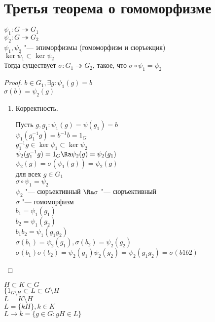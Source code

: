 ﻿\section{Третья теорема о гомоморфизме}
\begin{theorem}
$\psi_1 \colon G \twoheadrightarrow G_1$ \\
$\psi_2 \colon G \twoheadrightarrow G_2$ \\
$\psi_1, \psi_2$ "--- эпиморфизмы (гомоморфизм и сюръекция)\\
$\ker \psi_1 \subset \ker \psi_2$\\
Тогда существует $\sigma \colon G_1 \twoheadrightarrow G_2$, такое, что $\sigma \circ \psi_1 = \psi_2$\\
\end{theorem}
\begin{proof}
$b \in G_1, \exists g \colon \psi_1(g) = b$\\
$\sigma (b) = \psi_2(g)$\\

\begin{enumerate}
\item Корректность.

Пусть $g, g_1 \colon \psi_1(g) = \psi(g_1) = b$\\
$\psi_1(g_1^{-1}g) = b^{-1}b = 1_G$\\
$g_1^{-1}g \in \ker \psi_1 \subset \ker \psi_2$\\
$\psi_2(g_1^{-1}g) = 1_G \Ra \psi_2(g) = \psi_2(g_1)$\\

$\psi_2(g) = \sigma(\psi_1(g)) = \psi_2(g)$\\
для всех $g \in G_1$\\
$\sigma \circ \psi_1 = \psi_2$\\
$\psi_2$ "--- сюръективный $\Ra \sigma$ "--- сюръективный\\

$\sigma$ "--- гомоморфизм\\
$b_1 = \psi_1(g_1)$\\
$b_2 = \psi_1(g_2)$\\
$b_1b_2 = \psi_1(g_1g_2)$\\

$\sigma(b_1) = \psi_2(g_1), \sigma(b_2) = \psi_2(g_2)$\\
$\sigma(b_1)\sigma(b_2) = \psi_2(g_1) \psi_2(g_2) = \psi_2(g_1g_2) = \sigma(b1b2)$\\
\end{enumerate}
\end{proof}
\begin{Rem}
$H\subset K \subset G$\\
$\{1_{G\setminus H}\subset L \subset G \setminus H$ \\
$L = K \setminus H$\\
$L = \{kH\}, k \in K$\\
$L \to k = \{g \in G \colon gH \in L\}$\\
\end{Rem}

